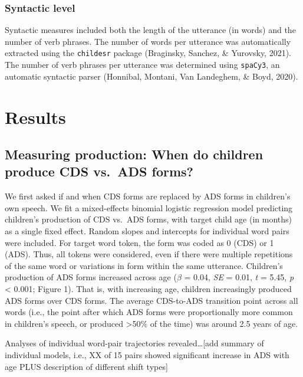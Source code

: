 \documentclass[10pt, letterpaper]{article}
\begin{document}
\hypertarget{syntactic-level}{%
\subsubsection{Syntactic level}\label{syntactic-level}}

Syntactic measures included both the length of the utterance (in words)
and the number of verb phrases. The number of words per utterance was
automatically extracted using the \texttt{childesr} package (Braginsky,
Sanchez, \& Yurovsky, 2021). The number of verb phrases per utterance
was determined using \texttt{spaCy3}, an automatic syntactic parser
(Honnibal, Montani, Van Landeghem, \& Boyd, 2020).

\hypertarget{results}{%
\section{Results}\label{results}}

\hypertarget{measuring-production-when-do-children-produce-cds-vs.-ads-forms}{%
\subsection{Measuring production: When do children produce CDS vs.~ADS
forms?}\label{measuring-production-when-do-children-produce-cds-vs.-ads-forms}}

We first asked if and when CDS forms are replaced by ADS forms in
children's own speech. We fit a mixed-effects binomial logistic
regression model predicting children's production of CDS vs.~ADS forms,
with target child age (in months) as a single fixed effect. Random
slopes and intercepts for individual word pairs were included. For
target word token, the form was coded as 0 (CDS) or 1 (ADS). Thus, all
tokens were considered, even if there were multiple repetitions of the
same word or variations in form within the same utterance. Children's
production of ADS forms increased across age (\(\beta\) = 0.04,
\emph{SE} = 0.01, \emph{t} = 5.45, \emph{p} \textless{} 0.001; Figure
1). That is, with increasing age, children increasingly produced ADS
forms over CDS forms. The average CDS-to-ADS transition point across all
words (i.e., the point after which ADS forms were proportionally more
common in children's speech, or produced \textgreater50\% of the time)
was around 2.5 years of age.

Analyses of individual word-pair trajectories revealed\ldots{[}add
summary of individual models, i.e., XX of 15 pairs showed significant
increase in ADS with age PLUS description of different shift types{]}
\end{document}
